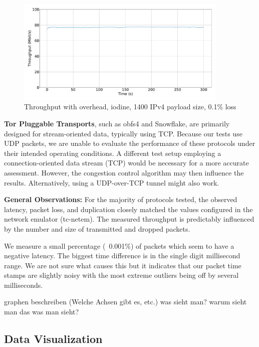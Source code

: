 \begin{figure}[tbh]
	\centering
	\includegraphics[draft=false,width=0.9\textwidth]{figures/Graphs/graph-5-iodine-constant-throughput/throughput.pdf}
	\caption{Throughput with overhead, iodine, 1400 IPv4 payload size, 0.1\% loss}
	\label{fig:graph-5-iodine-constant-throughput}
\end{figure}


\textbf{Tor Pluggable Transports}, such as obfs4 and Snowflake, are primarily designed for stream-oriented data, typically using TCP.
Because our tests use UDP packets, we are unable to evaluate the performance of these protocols under their intended operating conditions.
A different test setup employing a connection-oriented data stream (TCP) would be necessary for a more accurate assessment.
However, the congestion control algorithm may then influence the results.
Alternatively, using a UDP-over-TCP tunnel might also work.


\noindent\textbf{General Observations:}
For the majority of protocols tested, the observed latency, packet loss, and duplication closely matched the values configured in the network emulator (tc-netem).
The measured throughput is predictably influenced by the number and size of transmitted and dropped packets.

We measure a small percentage (~0.001\%) of packets which seem to have a negative latency.
The biggest time difference is in the single digit millisecond range.
We are not sure what causes this but it indicates that our packet time stamps are slightly noisy with the most extreme outliers being off by several milliseconds.


graphen beschreiben (Welche Achsen gibt es, etc.)
was sieht man?
warum sieht man das was man sieht?

\subsection{Data Visualization}
